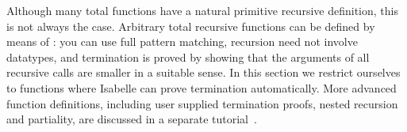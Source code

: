 Although many total functions have a natural primitive recursive definition,
this is not always the case. Arbitrary total recursive functions can be
defined by means of : you can use full pattern matching,
recursion need not involve datatypes, and termination is proved by showing
that the arguments of all recursive calls are smaller in a suitable sense.
In this section we restrict ourselves to functions where Isabelle can prove
termination automatically. More advanced function definitions, including user
supplied termination proofs, nested recursion and partiality, are discussed
in a separate tutorial~\cite{isabelle-function}.



